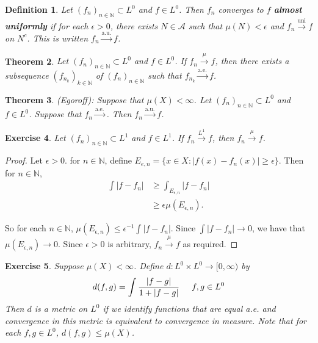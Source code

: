 \documentclass[12pt]{amsart}
\newtheorem{thm}{Theorem}[section]
\newtheorem{defn}[thm]{Definition}
\newtheorem{ex}[thm]{Exercise}
\newcommand{\ep}{\epsilon}
\newcommand{\N}{\mathbb{N}}
\newcommand{\MA}{\mathcal{A}}
\newcommand{\Rg}{[0,\infty)}
\newcommand{\conv}[1]{\xrightarrow{#1}}
\begin{document}
\begin{defn}
Let $(f_n)_{n \in \N} \subset L^0$ and $f \in L^0$. Then $f_n$ converges to $f$ \textbf{almost uniformly} if for each $\ep >0$, there exists $N \in \MA$ such that $\mu(N) < \ep$ and $f_n \xrightarrow{\text{uni}} f$ on $N^c$. This is written $f_n \xrightarrow{\text{a.u.}} f$.
\end{defn}

\begin{thm}
Let $(f_n)_{n \in \N} \subset L^0$ and $f \in L^0$. If $f_n \xrightarrow{\mu} f$, then there exists a subsequence $(f_{n_k})_{k \in \N}$ of $(f_n)_{n \in \N}$ such that $f_{n_k} \xrightarrow{\text{a.e.}} f$.
\end{thm}

\begin{thm}{(Egoroff):}
Suppose that $\mu(X) < \infty$. Let $(f_n)_{n \in \N} \subset L^0$ and $f \in L^0$. Suppose that $f_n \xrightarrow{\text{a.e.}}$. Then $f_n \xrightarrow{\text{a.u.}}f$.
\end{thm}

\begin{ex}
Let $(f_n)_{n \in \N} \subset L^1$ and $f \in L^1$. If $f_n \xrightarrow{L^1}f$, then $f_n \conv{\mu} f$.
\end{ex}

\begin{proof}
Let $\ep >0$. for $n \in \N$, define $E_{e,n} = \{x \in X: |f(x) - f_n(x)|\geq \ep\}$. Then for $n \in \N$,
\begin{align*}
\int |f - f_n|
& \geq \int_{E_{\ep,n}} |f- f_n|\\
& \geq \ep \mu(E_{\ep,n}).
\end{align*}

So for each $n \in \N$, $\mu(E_{\ep, n}) \leq \ep^{-1}\int |f - f_n|$. Since $\int |f - f_n| \conv{} 0$, we have that $\mu(E_{\ep,n}) \conv{} 0$. Since $\ep >0$ is arbitrary, $f_n \conv{\mu} f$ as required. 
\end{proof}

\begin{ex}
Suppose $\mu(X) < \infty$. Define $d:L^0 \times L^0 \rightarrow \Rg$ by $$d(f,g) = \int \frac{|f-g|}{1+|f-g|} \hspace{5mm} f,g \in L^0$$
Then $d$ is a metric on $L^0$ if we identify functions that are equal a.e. and convergence in this metric is equivalent to convergence in measure. Note that for each $f,g \in L^0$, $d(f,g) \leq \mu(X)$.
\end{ex} 
\end{document}
